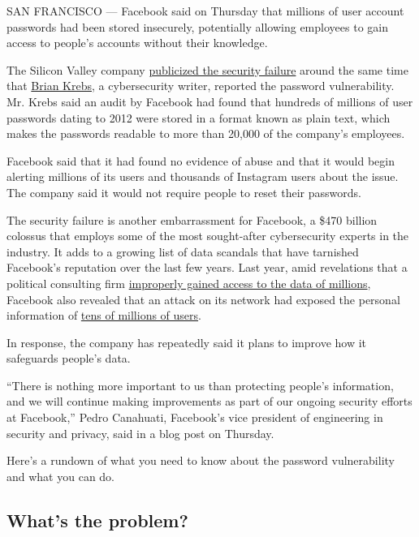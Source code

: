 SAN FRANCISCO --- Facebook said on Thursday that millions of user
account passwords had been stored insecurely, potentially allowing
employees to gain access to people's accounts without their knowledge.

The Silicon Valley company
\href{https://newsroom.fb.com/news/2019/03/keeping-passwords-secure/}{publicized
the security failure} around the same time that
\href{https://krebsonsecurity.com/2019/03/facebook-stored-hundreds-of-millions-of-user-passwords-in-plain-text-for-years/}{Brian
Krebs,} a cybersecurity writer, reported the password vulnerability. Mr.
Krebs said an audit by Facebook had found that hundreds of millions of
user passwords dating to 2012 were stored in a format known as plain
text, which makes the passwords readable to more than 20,000 of the
company's employees.

Facebook said that it had found no evidence of abuse and that it would
begin alerting millions of its users and thousands of Instagram users
about the issue. The company said it would not require people to reset
their passwords.

The security failure is another embarrassment for Facebook, a \$470
billion colossus that employs some of the most sought-after
cybersecurity experts in the industry. It adds to a growing list of data
scandals that have tarnished Facebook's reputation over the last few
years. Last year, amid revelations that a political consulting firm
\href{https://www.nytimes.com/2018/03/17/us/politics/cambridge-analytica-trump-campaign.html}{improperly
gained access to the data of millions}, Facebook also revealed that an
attack on its network had exposed the personal information of
\href{https://www.nytimes.com/2018/09/28/technology/facebook-hack-data-breach.html?action=click\&module=RelatedCoverage\&pgtype=Article\&region=Footer}{tens
of millions of users}.

In response, the company has repeatedly said it plans to improve how it
safeguards people's data.

``There is nothing more important to us than protecting people's
information, and we will continue making improvements as part of our
ongoing security efforts at Facebook,'' Pedro Canahuati, Facebook's vice
president of engineering in security and privacy, said in a blog post on
Thursday.

Here's a rundown of what you need to know about the password
vulnerability and what you can do.

\hypertarget{whats-the-problem}{%
\subsection{What's the problem?}\label{whats-the-problem}}

